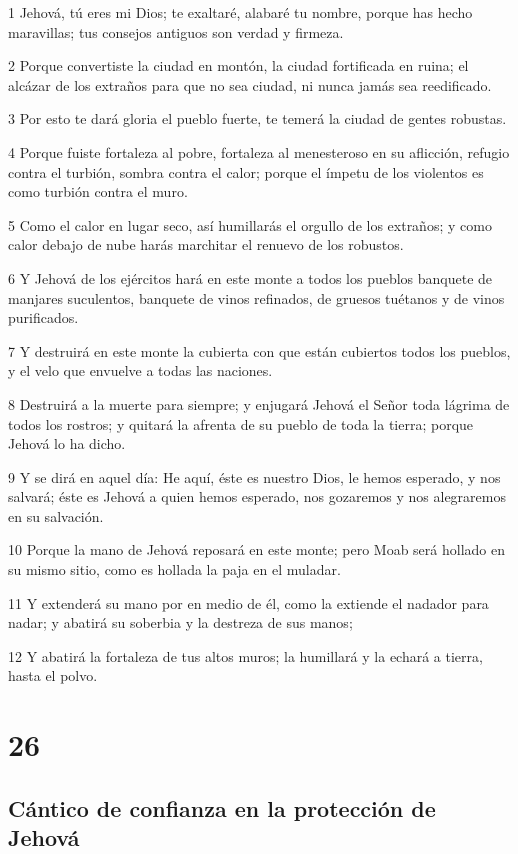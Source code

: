 \par 1 Jehová, tú eres mi Dios; te exaltaré, alabaré tu nombre, porque has hecho maravillas; tus consejos antiguos son verdad y firmeza.
\par 2 Porque convertiste la ciudad en montón, la ciudad fortificada en ruina; el alcázar de los extraños para que no sea ciudad, ni nunca jamás sea reedificado.
\par 3 Por esto te dará gloria el pueblo fuerte, te temerá la ciudad de gentes robustas. 
\par 4 Porque fuiste fortaleza al pobre, fortaleza al menesteroso en su aflicción, refugio contra el turbión, sombra contra el calor; porque el ímpetu de los violentos es como turbión contra el muro.
\par 5 Como el calor en lugar seco, así humillarás el orgullo de los extraños; y como calor debajo de nube harás marchitar el renuevo de los robustos.
\par 6 Y Jehová de los ejércitos hará en este monte a todos los pueblos banquete de manjares suculentos, banquete de vinos refinados, de gruesos tuétanos y de vinos purificados.
\par 7 Y destruirá en este monte la cubierta con que están cubiertos todos los pueblos, y el velo que envuelve a todas las naciones.
\par 8 Destruirá a la muerte para siempre; y enjugará Jehová el Señor toda lágrima de todos los rostros; y quitará la afrenta de su pueblo de toda la tierra; porque Jehová lo ha dicho.
\par 9 Y se dirá en aquel día: He aquí, éste es nuestro Dios, le hemos esperado, y nos salvará; éste es Jehová a quien hemos esperado, nos gozaremos y nos alegraremos en su salvación.
\par 10 Porque la mano de Jehová reposará en este monte; pero Moab será hollado en su mismo sitio, como es hollada la paja en el muladar.
\par 11 Y extenderá su mano por en medio de él, como la extiende el nadador para nadar; y abatirá su soberbia y la destreza de sus manos;
\par 12 Y abatirá la fortaleza de tus altos muros; la humillará y la echará a tierra, hasta el polvo.

\chapter{26}

\section*{Cántico de confianza en la protección de Jehová}


